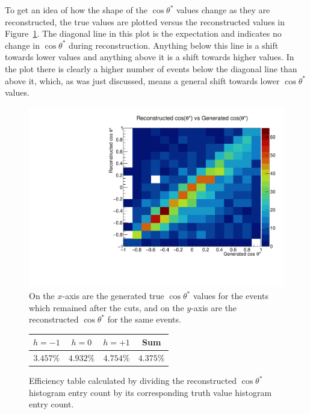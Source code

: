 \documentclass[12pt,a4paper]{article}
\numberwithin{equation}{section}
\begin{document}
To get an idea of how the shape of the $\cos \theta^*$ values change as they are
reconstructed, the true values are plotted versus the reconstructed values in
Figure~\ref{fig:2dhist}. The diagonal line in this plot is the expectation and
indicates no change in $\cos \theta^*$ during reconstruction. Anything below this
line is a shift towards lower values and anything above it is a shift towards
higher values. In the plot there is clearly a higher number of events below the
diagonal line than above it, which, as was just discussed, means a general shift
towards lower $\cos \theta^*$ values.
\cleardoublepage
\begin{figure}[H]
  \centering
  \includegraphics[width=0.6\linewidth]{figures/2dhist}
  \caption{\label{fig:2dhist} On the $x$-axis are the generated true $\cos \theta^*$ values for
    the events which remained after the cuts, and on the $y$-axis are the
    reconstructed $\cos \theta^*$ for the same events.}
\end{figure}


\begin{figure}[ht]
  \centering
  \begin{tabular}[H]{|c|c|c|c|}
    \hline
    $h=-1$    & $h=0$     & $h=+1$    & Sum       \\\hline
    $3.457\%$ & $4.932\%$ & $4.754\%$ & $4.375\%$ \\\hline
  \end{tabular}
  \caption{\label{fig:delphesefficiency}Efficiency table calculated by dividing
    the reconstructed $\cos \theta^*$ histogram entry count by its corresponding truth value histogram entry
    count.}
\end{figure}
\end{document}
